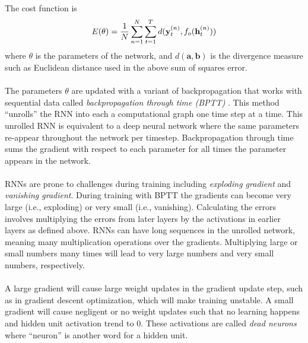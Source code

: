 The cost function is
\begin{equation}
    E(\theta) = \frac{1}{N} \sum_{n=1}^{N} \sum_{t=1}^{T} \\
    d(\mathbf{y}_t^{(n)}, f_o(\mathbf{h}_t^{(n)}))
\end{equation} where $\theta$ is the parameters of the network, and 
$d(\mathbf{a}, \mathbf{b})$ is the divergence measure such as Euclidean distance used 
in the above sum of squares error. 
\\\\
The parameters $\theta$ are updated with a variant of backpropagation that works with
sequential data called \textit{backpropagation through time (BPTT)} 
\cite{Wer:90}. This method ``unrolls'' the RNN into each a computational graph one
time step at a time. This unrolled RNN is equivalent to a deep neural network where the
same parameters re-appear throughout the network per timestep. Backpropagation through 
time sums the gradient with respect to each parameter for all times the parameter 
appears in the network.
\\\\
RNNs are prone to challenges during training including \textit{exploding gradient} and 
\textit{vanishing gradient}. During training with BPTT the gradients can become very 
large (i.e., exploding) or very small (i.e., vanishing). Calculating the errors involves
multiplying the errors from later layers by the activations in earlier layers as defined
above. RNNs can have long sequences in the unrolled network, meaning many multiplication
operations over the gradients. Multiplying large or small numbers many times will lead to
very large numbers and very small numbers, respectively.
\\\\
A large gradient will cause large weight updates in the gradient update step, such as 
in gradient descent optimization, which will make training unstable. A small gradient 
will cause negligent or no weight updates such that no learning happens and hidden unit 
activation trend to 0. These activations are called \textit{dead neurons} where 
``neuron'' is another word for a hidden unit.

